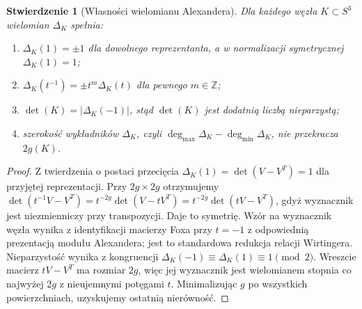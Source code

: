 \documentclass[11pt,a4paper]{report}
\numberwithin{equation}{section}
\theoremstyle{plain}
\newtheorem{stwierdzenie}[twierdzenie]{Stwierdzenie}
\theoremstyle{definition}
\theoremstyle{remark}
\begin{document}
\begin{stwierdzenie}[Własności wielomianu Alexandera]
Dla każdego węzła $K\subset S^3$ wielomian $\Delta_K$ spełnia:
\begin{enumerate}[label=(\roman*)]
\item $\Delta_K(1)=\pm1$ dla dowolnego reprezentanta, a w normalizacji
symetrycznej $\Delta_K(1)=1$;
\item $\Delta_K(t^{-1})=\pm t^m\Delta_K(t)$ dla pewnego $m\in\mathbb Z$;
\item $\det(K)=|\Delta_K(-1)|$, stąd $\det(K)$ jest dodatnią liczbą nieparzystą;
\item szerokość wykładników $\Delta_K$, czyli
$\deg_{\max}\Delta_K-\deg_{\min}\Delta_K$, nie przekracza $2g(K)$.
\end{enumerate}
\end{stwierdzenie}

\begin{proof}
Z twierdzenia o postaci przecięcia
$\Delta_K(1)=\det(V-V^T)=1$ dla przyjętej reprezentacji.
Przy $2g\times2g$ otrzymujemy
$\det(t^{-1}V-V^T)=t^{-2g}\det(V-tV^T)
=t^{-2g}\det(tV-V^T)$, gdyż wyznacznik jest niezmienniczy
przy transpozycji. Daje to symetrię. Wzór na wyznacznik
węzła wynika z identyfikacji macierzy Foxa przy $t=-1$
z odpowiednią prezentacją modułu Alexandera; jest to standardowa
redukcja relacji Wirtingera. Nieparzystość wynika z kongruencji
$\Delta_K(-1)\equiv\Delta_K(1)\equiv1\pmod2$.
Wreszcie macierz $tV-V^T$ ma rozmiar $2g$, więc jej
wyznacznik jest wielomianem stopnia co najwyżej $2g$
z nieujemnymi potęgami $t$. Minimalizując $g$ po wszystkich
powierzchniach, uzyskujemy ostatnią nierówność.
\end{proof}
\end{document}
